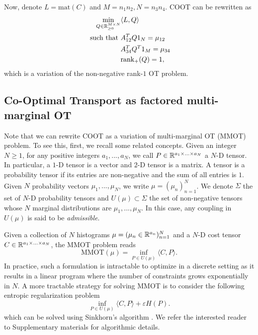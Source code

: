 Now, denote $L= \text{mat}(C)$ and $M = n_1 n_2, N = n_3 n_4$. COOT can be rewritten as
\begin{equation}
  \begin{split}
    \min_{Q \in \mathbb R^{M \times N}_{\geq 0}} &\langle L, Q \rangle \\
    \text{ such that } & A_{12}^T Q 1_N = \mu_{12} \\
    &A_{34}^T Q^T 1_M = \mu_{34} \\
    &\text{rank}_{+}(Q) = 1,
  \end{split}
\end{equation}
which is a variation of the non-negative rank-$1$ OT problem.

\subsection{Co-Optimal Transport as factored multi-marginal OT} \label{subsec:MMOT_DC}

Note that we can rewrite COOT as a variation of multi-marginal OT (MMOT) problem.
To see this, first, we recall some related concepts.
Given an integer $N \geq 1$, for any positive integers $a_1,..., a_N$, we call
$P \in \mathbb R^{a_1 \times ... \times a_N}$ a $N$-D tensor. In particular,
a $1$-D tensor is a vector and $2$-D tensor is a matrix.
A tensor is a probability tensor if its entries are non-negative and the sum of all entries is $1$.
Given $N$ probability vectors $\mu_1, ..., \mu_N$, we write $\mu = (\mu_n)_{n=1}^N$.
We denote $\Sigma$ the set of $N$-D probability tensors and $U(\mu) \subset \Sigma$ the set of non-negative tensors whose $N$
marginal distributions are $\mu_1, ..., \mu_N$. In this case, any coupling in $U(\mu)$ is said to be \textit{admissible}.

Given a collection of $N$ histograms $\mu = (\mu_n \in \mathbb R^{a_n})_{n=1}^N$
and a $N$-D cost tensor $C \in \mathbb R^{a_1 \times ... \times a_N}$, the MMOT problem reads
\begin{equation}
  \text{MMOT}(\mu) = \inf_{P \in U(\mu)} \langle C, P \rangle.
\end{equation}
In practice, such a formulation is intractable to optimize in a discrete setting as it results in a linear program where the number
of constraints grows exponentially in $N$. A more tractable strategy for solving MMOT is to consider the following entropic
regularization problem
\begin{equation} \label{MMOT_primal}
  \inf_{P \in U(\mu)} \langle C, P \rangle + \varepsilon H(P).
\end{equation}
which can be solved using Sinkhorn's algorithm \citep{Benamou14}. We refer the interested reader to Supplementary materials for algorithmic details.

